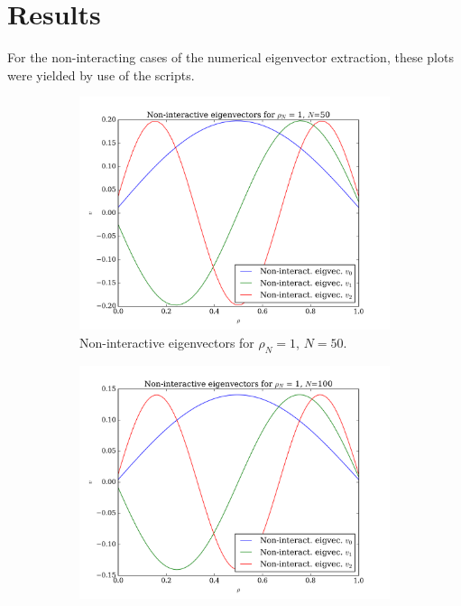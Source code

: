\documentclass[11pt,a4paper,notitlepage]{article}
\begin{document}
\section{Results}
For the non-interacting cases of the numerical eigenvector extraction, these plots were yielded by use of the scripts.
\begin{figure}[H]
\center
	\begin{subfigure}[t]{0.45\textwidth}
		\includegraphics[scale=0.40]{../non_interacting_eigvec_plot_rhoN=1_N=50.png}
		\caption{Non-interactive eigenvectors for $\rho_N = 1$, $N = 50$.}\label{fig:eigvecs-non-interact-1-50}
	\end{subfigure}
	\hfill
	\begin{subfigure}[t]{0.45\textwidth}
		\includegraphics[scale=0.40]{../non_interacting_eigvec_plot_rhoN=1_N=100.png}

\end{subfigure}
\end{figure}
\end{document}
